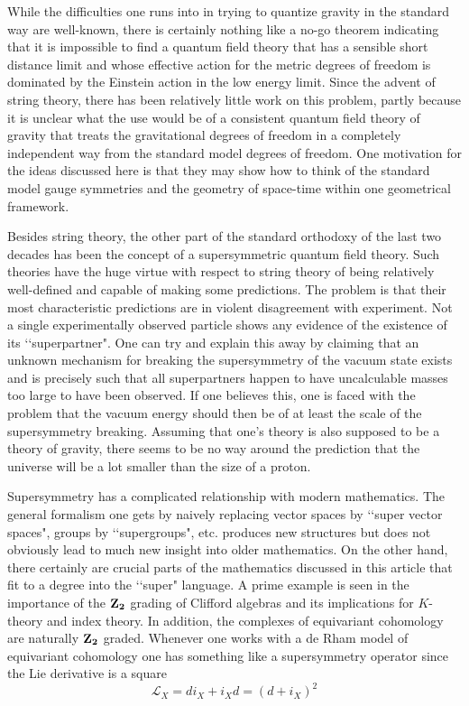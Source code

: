 \documentclass[a4paper,a4paper]{article}
\theoremstyle{conjecture}
\begin{document}
While the difficulties one runs into in trying to quantize gravity in the standard way are
well-known, there is certainly nothing like a no-go theorem indicating that it is impossible to find
a quantum field theory that has a sensible short distance limit and whose effective action for the
metric degrees of freedom is dominated by the Einstein action in the low energy limit.  Since the
advent of string theory, there has been relatively little work on this problem, partly because it is
unclear what the use would be of a consistent quantum field theory of gravity that treats the
gravitational degrees of freedom in a completely independent way from the standard model degrees of
freedom. One motivation for the ideas discussed here is that they may show how to think of the
standard model gauge symmetries and the geometry of space-time within one geometrical framework.

Besides string theory, the other part of the standard orthodoxy of the last two decades has
been the concept of a supersymmetric quantum field theory.  Such theories have the huge virtue
with respect to string theory of being relatively well-defined and capable of making some predictions.
The problem is that their most characteristic predictions are in violent disagreement with
experiment.  Not a single experimentally observed particle shows any evidence of the existence
of its \lq\lq superpartner".  One can try and explain this away by claiming that an unknown
mechanism for breaking the supersymmetry of the vacuum state exists and is precisely such that
all superpartners happen to have uncalculable masses too large to have been observed.  If one 
believes this,  one is faced with the problem that the vacuum energy should then be of at least
the scale of the supersymmetry breaking.  Assuming that one's theory is also supposed to be
a theory of gravity, there seems to be no way around the prediction that the universe will be
a lot smaller than the size of a proton.

Supersymmetry has a complicated relationship with modern mathematics. The general formalism one gets by naively replacing
vector spaces by \lq\lq super vector spaces", groups by \lq\lq supergroups", etc. produces new structures but does not
obviously lead to much new insight into older mathematics. On the other hand, there certainly are crucial parts of the
mathematics discussed in this article that fit to a degree into the \lq\lq super" language. A prime example is seen in the
importance of the $\bf Z_2$ grading of Clifford algebras and its implications for $K$-theory and index theory.  In addition,
the complexes of equivariant cohomology are naturally $\bf Z_2$ graded. Whenever one works with a de Rham model of equivariant
cohomology one has something like a supersymmetry operator since the Lie derivative is a square $$\mathcal L_X=di_X
+i_Xd=(d+i_X)^2$$
\end{document}
